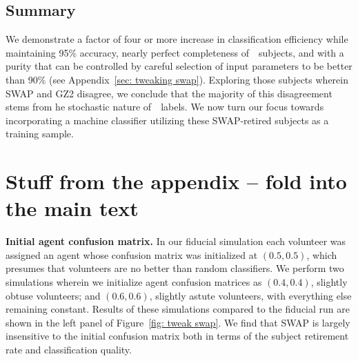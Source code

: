 \subsection{Summary}



We demonstrate a factor of four or more increase in 
classification efficiency while maintaining 95\% accuracy, nearly perfect 
completeness of~\feat~subjects, and with a purity that can be controlled by careful 
selection of input parameters to be better than 90\% (see Appendix~\ref{sec: tweaking swap}).
Exploring those subjects wherein SWAP and GZ2 disagree, we conclude that 
the majority of this disagreement stems from he stochastic nature of~\raw~labels.
We now turn our focus towards incorporating a machine
classifier utilizing these SWAP-retired subjects as a training sample. 




\section{Stuff from the appendix -- fold into the main text}

\textbf{Initial agent confusion matrix.} 
In our fiducial simulation each volunteer was assigned an agent whose confusion matrix was
initialized at $(0.5, 0.5)$, which presumes that volunteers are no better than random classifiers.  
We perform two simulations wherein we initialize agent confusion matrices as $(0.4, 0.4)$, 
slightly obtuse volunteers; and $(0.6, 0.6)$, slightly astute volunteers, with everything else remaining constant.  
Results of these simulations compared to the fiducial run are shown in the left panel of
Figure~\ref{fig: tweak swap}. We find that SWAP is largely insensitive to the 
initial confusion matrix  both in terms of the subject retirement rate and classification quality.  



